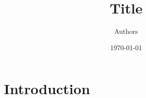 \documentclass[12pt]{amsart}
\title{Title}
\author{Authors}
\date{\today}
\begin{document}
\begin{abstract}

\end{abstract}

\maketitle


\section{Introduction} \label{sec:Introduction}







\end{document}
